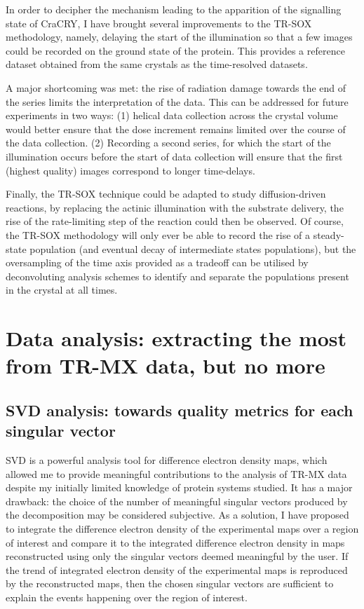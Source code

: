 In order to decipher the mechanism leading to the apparition of the signalling state of CraCRY, I have brought several improvements to the TR-SOX methodology, namely, delaying the start of the illumination so that a few images could be recorded on the ground state of the protein. This provides a reference dataset obtained from the same crystals as the time-resolved datasets. 

A major shortcoming was met: the rise of radiation damage towards the end of the series limits the interpretation of the data. This can be addressed for future experiments in two ways: (1) helical data collection across the crystal volume would better ensure that the dose increment remains limited over the course of the data collection. (2) Recording a second series, for which the start of the illumination occurs before the start of data collection will ensure that the first (highest quality) images correspond to longer time-delays. 

Finally, the TR-SOX technique could be adapted to study diffusion-driven reactions, by replacing the actinic illumination with the substrate delivery, the rise of the rate-limiting step of the reaction could then be observed. 
\vspace{2mm}
Of course, the TR-SOX methodology will only ever be able to record the rise of a steady-state population (and eventual decay of intermediate states populations), but the oversampling of the time axis provided as a tradeoff can be utilised by deconvoluting analysis schemes to identify and separate the populations present in the crystal at all times. 

\section{Data analysis: extracting the most from TR-MX data, but no more}

\subsection{SVD analysis: towards quality metrics for each singular vector}

SVD is a powerful analysis tool for difference electron density maps, which allowed me to provide meaningful contributions to the analysis of TR-MX data despite my initially limited knowledge of protein systems studied. It has a major drawback: the choice of the number of meaningful singular vectors produced by the decomposition may be considered subjective. As a solution, I have proposed to integrate the difference electron density of the experimental maps over a region of interest and compare it to the integrated difference electron density in maps reconstructed using only the singular vectors deemed meaningful by the user. If the trend of integrated electron density of the experimental maps is reproduced by the reconstructed maps, then the chosen singular vectors are sufficient to explain the events happening over the region of interest. 

